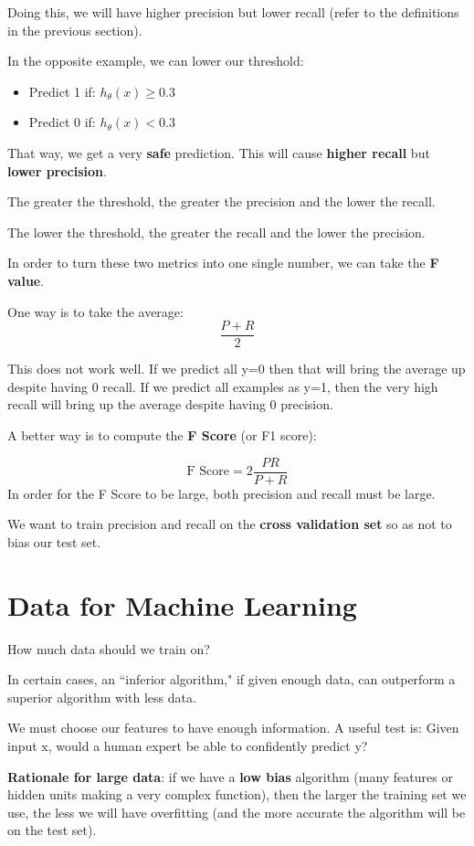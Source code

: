 Doing this, we will have higher precision but lower recall (refer to the definitions in the previous section).

In the opposite example, we can lower our threshold:
\begin{itemize}
\item Predict 1 if: $h_\theta(x) \geq 0.3$
\item Predict 0 if: $h_\theta(x) < 0.3$
\end{itemize}

That way, we get a very \textbf{safe} prediction. This will cause \textbf{higher recall} but \textbf{lower precision}.

The greater the threshold, the greater the precision and the lower the recall.

The lower the threshold, the greater the recall and the lower the precision.

In order to turn these two metrics into one single number, we can take the \textbf{F value}.

One way is to take the average:
$$\dfrac{P+R}{2} $$

This does not work well. If we predict all y=0 then that will bring the average up despite having 0 recall. If we predict all examples as y=1, then the very high recall will bring up the average despite having 0 precision.

A better way is to compute the \textbf{F Score} (or F1 score):

$$\text{F Score} = 2\dfrac{PR}{P + R}$$
In order for the F Score to be large, both precision and recall must be large.

We want to train precision and recall on the \textbf{cross validation set} so as not to bias our test set.
\section{Data for Machine Learning}
How much data should we train on?

In certain cases, an ``inferior algorithm," if given enough data, can outperform a superior algorithm with less data.

We must choose our features to have enough information. A useful test is: Given input x, would a human expert be able to confidently predict y?

\textbf{Rationale for large data}: if we have a \textbf{low bias} algorithm (many features or hidden units making a very complex function), then the larger the training set we use, the less we will have overfitting (and the more accurate the algorithm will be on the test set). 
